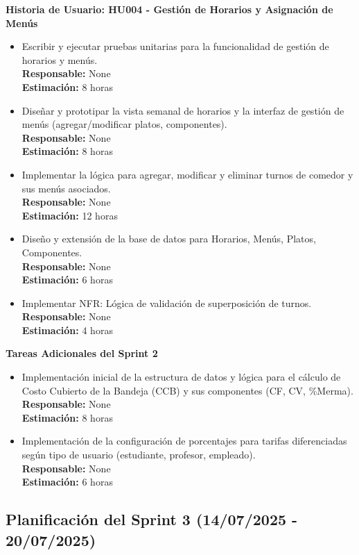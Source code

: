 \documentclass[12pt]{article}
\begin{document}
\textbf{Historia de Usuario: HU004 - Gestión de Horarios y Asignación de Menús}
\begin{itemize}
	\item Escribir y ejecutar pruebas unitarias para la funcionalidad de gestión de horarios y menús. \\
	\textbf{Responsable:} None \\
	\textbf{Estimación:} 8 horas
	\item Diseñar y prototipar la vista semanal de horarios y la interfaz de gestión de menús (agregar/modificar platos, componentes). \\
	\textbf{Responsable:} None \\
	\textbf{Estimación:} 8 horas
	\item Implementar la lógica para agregar, modificar y eliminar turnos de comedor y sus menús asociados. \\
	\textbf{Responsable:} None \\
	\textbf{Estimación:} 12 horas
	\item Diseño y extensión de la base de datos para Horarios, Menús, Platos, Componentes. \\
	\textbf{Responsable:} None \\
	\textbf{Estimación:} 6 horas
	\item Implementar NFR: Lógica de validación de superposición de turnos. \\
	\textbf{Responsable:} None \\
	\textbf{Estimación:} 4 horas
\end{itemize}

\textbf{Tareas Adicionales del Sprint 2}
\begin{itemize}
    \item Implementación inicial de la estructura de datos y lógica para el cálculo de Costo Cubierto de la Bandeja (CCB) y sus componentes (CF, CV, \%Merma). \\
    \textbf{Responsable:} None \\
    \textbf{Estimación:} 8 horas
    \item Implementación de la configuración de porcentajes para tarifas diferenciadas según tipo de usuario (estudiante, profesor, empleado). \\
    \textbf{Responsable:} None \\
    \textbf{Estimación:} 6 horas
\end{itemize}

\subsection{Planificación del Sprint 3 (14/07/2025 - 20/07/2025)}
\end{document}
